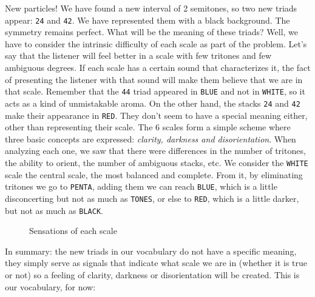 \documentclass[]{report}
\begin{document}
New particles! We have found a new interval of 2 semitones, so two new triads appear: \texttt{24} and \texttt{42}. We have represented them with a black background. The symmetry remains perfect. What will be the meaning of these triads?
Well, we have to consider the intrinsic difficulty of each scale as part of the problem. Let's say that the listener will feel better in a scale with few tritones and few ambiguous degrees. If each scale has a certain sound that characterizes it, the fact of presenting the listener with that sound will make them believe that we are in that scale. Remember that the \texttt{44} triad appeared in \texttt{BLUE} and not in \texttt{WHITE}, so it acts as a kind of unmistakable aroma.
On the other hand, the stacks \texttt{24} and \texttt{42} make their appearance in \texttt{RED}. They don't seem to have a special meaning either, other than representing their scale.
The 6 scales form a simple scheme where three basic concepts are expressed: \emph{clarity, darkness and disorientation}. When analyzing each one, we saw that there were differences in the number of tritones, the ability to orient, the number of ambiguous stacks, etc. We consider the \texttt{WHITE} scale the central scale, the most balanced and complete. From it, by eliminating tritones we go to \texttt{PENTA}, adding them we can reach \texttt{BLUE}, which is a little disconcerting but not as much as \texttt{TONES}, or else to \texttt{RED}, which is a little darker, but not as much as \texttt{BLACK}.
\begin{figure}[H]
\caption{Sensations of each scale }\label{tab:scale-sensation}
\end{figure}
In summary: the new triads in our vocabulary do not have a specific meaning, they simply serve as signals that indicate what scale we are in (whether it is true or not) so a feeling of clarity, darkness or disorientation will be created.
This is our vocabulary, for now:
\end{document}
